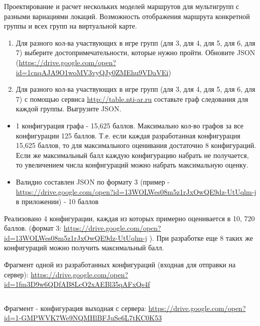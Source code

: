 
Проектирование и расчет нескольких моделей маршрутов для мультигрупп с разными вариациями локаций. Возможность отображения маршрута конкретной группы и всех групп на виртуальной карте.
\begin{enumerate}
    \item    Для разного кол-ва участвующих в игре групп (для 3, для 4, для 5, для 6, для 7) выберите достопримечательности, которые нужно пройти. Обновите JSON (\url{https://drive.google.com/open?id=1cnqAJA9O1woMV3vyQJy0ZMEhu9VDaVEi})
    \item    Для разного кол-ва участвующих в игре групп (для 3, для 4, для 5, для 6, для 7) с помощью сервиса \url{http://table.nti-ar.ru} составьте граф следования для каждой группы. Выгрузите JSON.
\end{enumerate}

\markSection
\begin{itemize}
    \item 	1 конфигурация графа - 15,625 баллов. Максимально кол-во графов за все конфигурации 125 баллов. Т.е. если каждая разработанная конфигурация 15,625 баллов, то для максимального оценивания достаточно 8 конфигураций. Если же максимальный балл каждую конфигурацию набрать не получается, то увеличением числа конфигураций можно набрать максимальную оценку. 
    \item Валидно составлен JSON по формату 3 (пример - \url{https://drive.google.com/open?id=13WOLWes08m5z1rJxOwQE9dz-UtUqlm-j}  в приложении) - 10 баллов
\end{itemize}

\solutionSection

Реализовано 4 конфигурации, каждая из которых примерно оценивается в 10, 720 баллов. (формат 3: \url{https://drive.google.com/open?id=13WOLWes08m5z1rJxOwQE9dz-UtUqlm-j} ). При разработке еще 8 таких же конфигураций можно получить максимальный балл. 

Фрагмент одной из разработанных конфигураций (входная для отправки на сервер):
\url{https://drive.google.com/open?id=1fm3D9w6QDfAB8LcO2xAEBl35qAFxQs4f}

\inputminted[fontsize=\footnotesize, linenos]{json}{final/command_tour/ar/task_06/source_1.json}

Фрагмент - конфигурация выходная с сервера:
\url{https://drive.google.com/open?id=1-GMPWVK7We9NQMHlBFJuSe6L7tKC0K53}

\inputminted[fontsize=\footnotesize, linenos]{json}{final/command_tour/ar/task_06/source_2.json}

